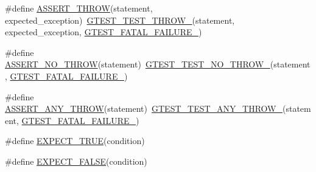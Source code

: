 \begin{DoxyCompactItemize}
\item 
\#define \mbox{\hyperlink{_obj__test_2lib_2googletest-release-1_88_81_2googletest_2include_2gtest_2gtest_8h_aedb1eddae6c2a2430b0e7b7e03b4f052}{A\+S\+S\+E\+R\+T\+\_\+\+T\+H\+R\+OW}}(statement,  expected\+\_\+exception)~\mbox{\hyperlink{_obj__test_2lib_2googletest-release-1_88_81_2googletest_2include_2gtest_2internal_2gtest-internal_8h_a3f71db93eaf30b0cfca9612b9ac32106}{G\+T\+E\+S\+T\+\_\+\+T\+E\+S\+T\+\_\+\+T\+H\+R\+O\+W\+\_\+}}(statement, expected\+\_\+exception, \mbox{\hyperlink{_obj__test_2lib_2googletest-release-1_88_81_2googletest_2include_2gtest_2internal_2gtest-internal_8h_a0f9a4c3ea82cc7bf4478eaffdc168358}{G\+T\+E\+S\+T\+\_\+\+F\+A\+T\+A\+L\+\_\+\+F\+A\+I\+L\+U\+R\+E\+\_\+}})
\item 
\#define \mbox{\hyperlink{_obj__test_2lib_2googletest-release-1_88_81_2googletest_2include_2gtest_2gtest_8h_a895c34d9b192cdc2ba46d2680623485d}{A\+S\+S\+E\+R\+T\+\_\+\+N\+O\+\_\+\+T\+H\+R\+OW}}(statement)~\mbox{\hyperlink{_obj__test_2lib_2googletest-release-1_88_81_2googletest_2include_2gtest_2internal_2gtest-internal_8h_a9a109d026b5a904646437d7570e13581}{G\+T\+E\+S\+T\+\_\+\+T\+E\+S\+T\+\_\+\+N\+O\+\_\+\+T\+H\+R\+O\+W\+\_\+}}(statement, \mbox{\hyperlink{_obj__test_2lib_2googletest-release-1_88_81_2googletest_2include_2gtest_2internal_2gtest-internal_8h_a0f9a4c3ea82cc7bf4478eaffdc168358}{G\+T\+E\+S\+T\+\_\+\+F\+A\+T\+A\+L\+\_\+\+F\+A\+I\+L\+U\+R\+E\+\_\+}})
\item 
\#define \mbox{\hyperlink{_obj__test_2lib_2googletest-release-1_88_81_2googletest_2include_2gtest_2gtest_8h_affadeef9379fe5aabf6f28d9eab9d3c0}{A\+S\+S\+E\+R\+T\+\_\+\+A\+N\+Y\+\_\+\+T\+H\+R\+OW}}(statement)~\mbox{\hyperlink{_obj__test_2lib_2googletest-release-1_88_81_2googletest_2include_2gtest_2internal_2gtest-internal_8h_af48bbd26d54d4afc5e4cef39b1c76ba3}{G\+T\+E\+S\+T\+\_\+\+T\+E\+S\+T\+\_\+\+A\+N\+Y\+\_\+\+T\+H\+R\+O\+W\+\_\+}}(statement, \mbox{\hyperlink{_obj__test_2lib_2googletest-release-1_88_81_2googletest_2include_2gtest_2internal_2gtest-internal_8h_a0f9a4c3ea82cc7bf4478eaffdc168358}{G\+T\+E\+S\+T\+\_\+\+F\+A\+T\+A\+L\+\_\+\+F\+A\+I\+L\+U\+R\+E\+\_\+}})
\item 
\#define \mbox{\hyperlink{_obj__test_2lib_2googletest-release-1_88_81_2googletest_2include_2gtest_2gtest_8h_ac33e7cdfb5d44a7a0f0ab552eb5c3c6a}{E\+X\+P\+E\+C\+T\+\_\+\+T\+R\+UE}}(condition)
\item 
\#define \mbox{\hyperlink{_obj__test_2lib_2googletest-release-1_88_81_2googletest_2include_2gtest_2gtest_8h_aeb6c7ae89f440c90c1a1815951c836da}{E\+X\+P\+E\+C\+T\+\_\+\+F\+A\+L\+SE}}(condition)

\end{DoxyCompactItemize}
